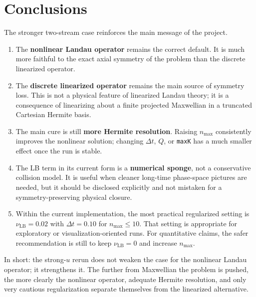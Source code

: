 \documentclass[11pt]{article}
\begin{document}
\section{Conclusions}
The stronger two-stream case reinforces the main message of the project.
\begin{enumerate}[leftmargin=1.5em]
    \item The \textbf{nonlinear Landau operator} remains the correct default.
    It is much more faithful to the exact axial symmetry of the problem than the discrete linearized operator.
    \item The \textbf{discrete linearized operator} remains the main source of symmetry loss.
    This is not a physical feature of linearized Landau theory; it is a consequence of linearizing about a finite projected Maxwellian in a truncated Cartesian Hermite basis.
    \item The main cure is still \textbf{more Hermite resolution}.
    Raising \(n_{\max}\) consistently improves the nonlinear solution; changing \(\Delta t\), \(Q\), or \texttt{maxK} has a much smaller effect once the run is stable.
    \item The LB term in its current form is a \textbf{numerical sponge}, not a conservative collision model.
    It is useful when cleaner long-time phase-space pictures are needed, but it should be disclosed explicitly and not mistaken for a symmetry-preserving physical closure.
    \item Within the current implementation, the most practical regularized setting is \(\nu_{\mathrm{LB}}=0.02\) with \(\Delta t=0.10\) for \(n_{\max}\le 10\).
    That setting is appropriate for exploratory or visualization-oriented runs.
    For quantitative claims, the safer recommendation is still to keep \(\nu_{\mathrm{LB}}=0\) and increase \(n_{\max}\).
\end{enumerate}

In short: the strong-$u$ rerun does not weaken the case for the nonlinear Landau operator; it strengthens it.
The further from Maxwellian the problem is pushed, the more clearly the nonlinear operator, adequate Hermite resolution, and only very cautious regularization separate themselves from the linearized alternative.
\end{document}

